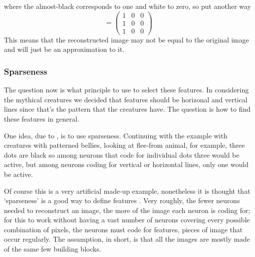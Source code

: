 \documentclass[11pt,a4paper]{scrartcl}
\begin{document}
\begin{center}
\end{center}
where the almost-black corresponds to one and white to zero, so put another way
\begin{equation}
[W^1_{ij}]=\left(\begin{array}{lll}1&0&0\\1&0&0\\1&0&0\end{array}\right)
\end{equation}
This means that the
reconstructed image may not be equal to the original image and will just
be an approximation to it. 


\subsubsection*{Sparseness}

The question now is what principle to use to select these features. In
considering the mythical creatures we decided that features should be
horizonal and vertical lines since that's the pattern that the
creatures have. The question is how to find these features in general.


One idea, due to \cite{OlshausenField1996a,OlshausenField1997a}, is to
use sparseness. Continuing with the example with creatures with patterned
bellies, looking at flee-from animal, for example, three dots are
black so among neurons that code for individual dots three would be
active, but among neurons coding for vertical or horizontal lines,
only one would be active.

Of course this is a very artificial made-up example, nonetheless it is
thought that \lq{}sparseness\rq{} is a good way to define features
\cite{OlshausenField1996a,OlshausenField1997a}. Very roughly, the
fewer neurons needed to reconstruct an image, the more of the image
each neuron is coding for; for this to work without having a vast
number of neurons covering every possible combination of pixels, the
neurons must code for features, pieces of image that occur
regularly. The assumption, in short, is that all the images are mostly
made of the same few building blocks.
\end{document}
